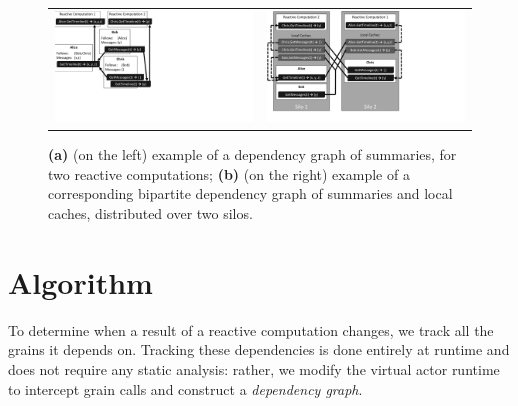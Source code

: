 
\begin{figure}
\centering
\begin{tabular}{cc}
\includegraphics[scale=.45, viewport=-1 164 480 540]{figs/summaries}
&
\includegraphics[scale=.4, viewport=-10 53 656 540]{figs/silos}\\
\end{tabular}
\caption{\textbf{(a)}  (on the left) example of a dependency graph of summaries, for two reactive computations; \textbf{(b)} (on the right) example of a corresponding bipartite dependency graph of summaries and local caches, distributed over two silos.}\label{fig:summaries}
\end{figure}

\section{Algorithm}

To determine when a result of a reactive computation changes, we track all the grains it depends on. Tracking these dependencies is done entirely at runtime and does not require any static analysis: rather, we modify the virtual actor runtime to intercept grain calls and construct a \emph{dependency graph}.

